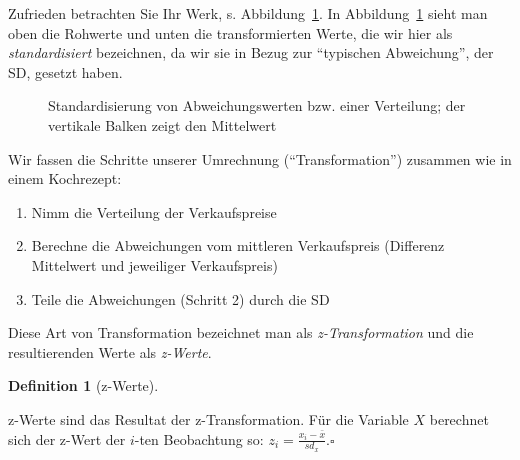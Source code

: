 \documentclass[
  a4paper,
]{scrbook}
\providecommand{\tightlist}{%
  \setlength{\itemsep}{0pt}\setlength{\parskip}{0pt}}\usepackage{longtable,booktabs,array}
\theoremstyle{definition}
\theoremstyle{definition}
\newtheorem{definition}{Definition}[chapter]
\theoremstyle{definition}
\theoremstyle{remark}
\begin{document}
Zufrieden betrachten Sie Ihr Werk, s. Abbildung~\ref{fig-z-transf}. In
Abbildung~\ref{fig-z-transf} sieht man oben die Rohwerte und unten die
transformierten Werte, die wir hier als \emph{standardisiert}
bezeichnen, da wir sie in Bezug zur ``typischen Abweichung'', der SD,
gesetzt haben.

\begin{figure}


\caption{\label{fig-z-transf}Standardisierung von Abweichungswerten bzw.
einer Verteilung; der vertikale Balken zeigt den Mittelwert}

\end{figure}%

Wir fassen die Schritte unserer Umrechnung (``Transformation'') zusammen
wie in einem Kochrezept:

\begin{enumerate}
\def\labelenumi{\arabic{enumi}.}
\tightlist
\item
  Nimm die Verteilung der Verkaufspreise
\item
  Berechne die Abweichungen vom mittleren Verkaufspreis (Differenz
  Mittelwert und jeweiliger Verkaufspreis)
\item
  Teile die Abweichungen (Schritt 2) durch die SD
\end{enumerate}

Diese Art von Transformation bezeichnet man als \emph{z-Transformation}
und die resultierenden Werte als \emph{z-Werte}.

\begin{definition}[z-Werte]\protect\hypertarget{def-z-werte}{}\label{def-z-werte}

z-Werte sind das Resultat der z-Transformation. Für die Variable \(X\)
berechnet sich der z-Wert der \(i\)-ten Beobachtung so:
\(z_i = \frac{x_i - \bar{x}}{sd_x}.\square\)

\end{definition}
\end{document}
